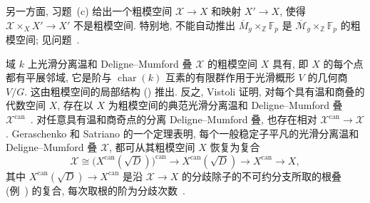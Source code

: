 另一方面, 习题~(c) 给出一个粗模空间 $\mathcal X\to X$ 和映射 $X'\to X$, 使得 $\mathcal X\times_X X'\to X'$ 不是粗模空间. 特别地, 不能自动推出 $\overline M_g\times_{\mathbb Z}\mathbb F_p$ 是 $\overline{\mathcal M}_g\times_{\mathbb Z}\mathbb F_p$ 的粗模空间; 见问题~.
\begin{remark}[典范叠与粗模空间的自下而上分类]\label{src:5.4.25}
域 $k$ 上光滑分离温和 Deligne--Mumford 叠 $\mathcal X$ 的粗模空间 $X$ 具有, 即 $X$ 的每个点都有平展邻域, 它是阶与 $\operatorname{char}(k)$ 互素的有限群作用于光滑概形 $V$ 的几何商 $V/G$. 这由粗模空间的局部结构 () 推出. 反之, Vistoli 证明, 对每个具有温和商叠的代数空间 $X$, 存在以 $X$ 为粗模空间的典范光滑分离温和 Deligne--Mumford 叠 $\mathcal X^{\mathrm{can}}$~\cite[命题 $2.8$]{Vis89}. 对任意具有温和商奇点的分离 Deligne--Mumford 叠, 也存在相对 $\mathcal X^{\mathrm{can}}\to\mathcal X$. Geraschenko 和 Satriano 的一个定理表明, 每个一般稳定子平凡的光滑分离温和 Deligne--Mumford 叠 $\mathcal X$, 都可从其粗模空间 $X$ 恢复为复合
\[
\mathcal X\cong\bigl(X^{\mathrm{can}}(\sqrt D)\bigr)^{\mathrm{can}}\longrightarrow X^{\mathrm{can}}(\sqrt D)\longrightarrow X^{\mathrm{can}}\longrightarrow X,
\]
其中 $X^{\mathrm{can}}(\sqrt D)\to X^{\mathrm{can}}$ 是沿 $\mathcal X\to X$ 的分歧除子的不可约分支所取的根叠 (例~) 的复合, 每次取根的阶为分歧次数~\cite{GS15}.
\end{remark}

